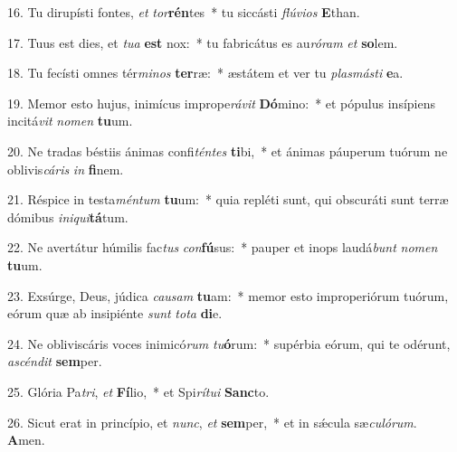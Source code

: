 16. Tu dirupísti fontes, \textit{et} \textit{tor}\textbf{rén}tes~*  tu siccásti \textit{flú}\textit{vi}\textit{os} \textbf{E}than.\

17. Tuus est dies, et \textit{tu}\textit{a} \textbf{est} nox:~*  tu fabricátus es au\textit{ró}\textit{ram} \textit{et} \textbf{so}lem.\

18. Tu fecísti omnes tér\textit{mi}\textit{nos} \textbf{ter}ræ:~*  æstátem et ver tu \textit{plas}\textit{más}\textit{ti} \textbf{e}a.\

19. Memor esto hujus, inimícus imprope\textit{rá}\textit{vit} \textbf{Dó}mino:~*  et pópulus insípiens incitá\textit{vit} \textit{no}\textit{men} \textbf{tu}um.\

20. Ne tradas béstiis ánimas confi\textit{tén}\textit{tes} \textbf{ti}bi,~*  et ánimas páuperum tuórum ne oblivis\textit{cá}\textit{ris} \textit{in} \textbf{fi}nem.\

21. Réspice in testa\textit{mén}\textit{tum} \textbf{tu}um:~*  quia repléti sunt, qui obscuráti sunt terræ dómibus \textit{in}\textit{i}\textit{qui}\textbf{tá}tum.\

22. Ne avertátur húmilis fac\textit{tus} \textit{con}\textbf{fú}sus:~*  pauper et inops laudá\textit{bunt} \textit{no}\textit{men} \textbf{tu}um.\

23. Exsúrge, Deus, júdica \textit{cau}\textit{sam} \textbf{tu}am:~*  memor esto improperiórum tuórum, eórum quæ ab insipiénte \textit{sunt} \textit{to}\textit{ta} \textbf{di}e.\

24. Ne obliviscáris voces inimicó\textit{rum} \textit{tu}\textbf{ó}rum:~*  supérbia eórum, qui te odérunt, \textit{a}\textit{scén}\textit{dit} \textbf{sem}per.\

25. Glória Pa\textit{tri}, \textit{et} \textbf{Fí}lio,~*  et Spi\textit{rí}\textit{tu}\textit{i} \textbf{Sanc}to.\

26. Sicut erat in princípio, et \textit{nunc}, \textit{et} \textbf{sem}per,~*  et in sǽcula sæ\textit{cu}\textit{ló}\textit{rum}. \textbf{A}men.\

